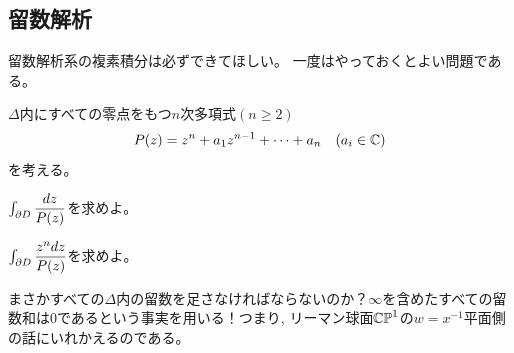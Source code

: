 \subsection{留数解析}
留数解析系の複素積分は必ずできてほしい。
一度はやっておくとよい問題である。
\begin{egprob}
$\Delta$内にすべての零点をもつ$n$次多項式$(n\geq 2)$
\[P(z) = z^n + a_1z^{n-1} + \cdots + a_n \quad (a_i \in\mathbb{C})\]
を考える。
\ben
\item $\int_{\partial D} \dfrac{dz}{P(z)}$を求めよ。
\item $\int_{\partial D}\dfrac{z^ndz}{P(z)}$を求めよ。
\een
\end{egprob}
\begin{screen}
まさかすべての$\Delta$内の留数を足さなければならないのか？$\infty$を含めたすべての留数和は$0$であるという事実を用いる！つまり, リーマン球面$\mathbb{CP}^1$の$w=x^{-1}$平面側の話にいれかえるのである。
\end{screen}


